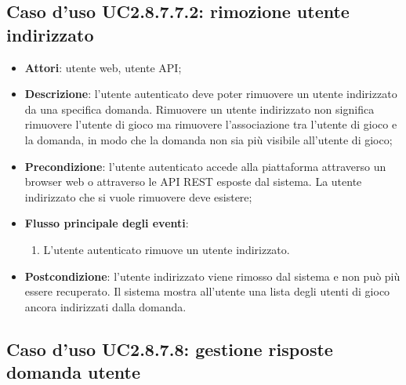 \subsection{Caso d'uso UC2.8.7.7.2: rimozione utente indirizzato}
\begin{itemize}
\item \textbf{Attori}: utente web, utente API;
\item \textbf{Descrizione}: l'utente autenticato deve poter rimuovere un utente indirizzato da una specifica domanda. Rimuovere un utente indirizzato non significa rimuovere l'utente di gioco ma rimuovere l'associazione tra l'utente di gioco e la domanda, in modo che la domanda non sia più visibile all'utente di gioco; 
      \item \textbf{Precondizione}: l'utente autenticato accede alla piattaforma attraverso un browser web o attraverso le API REST esposte dal sistema. La utente indirizzato che si vuole rimuovere deve esistere;

        \item \textbf{Flusso principale degli eventi}:
          \begin{enumerate}
          \item L'utente autenticato rimuove un utente indirizzato.

      \end{enumerate}
    \item \textbf{Postcondizione}: l'utente indirizzato viene rimosso dal sistema e non può più essere recuperato. Il sistema mostra all'utente una lista degli utenti di gioco ancora indirizzati dalla domanda.
  \end{itemize}
\hypertarget{UC2.8.7.8}{}
\subsection{Caso d'uso UC2.8.7.8: gestione risposte domanda utente}

